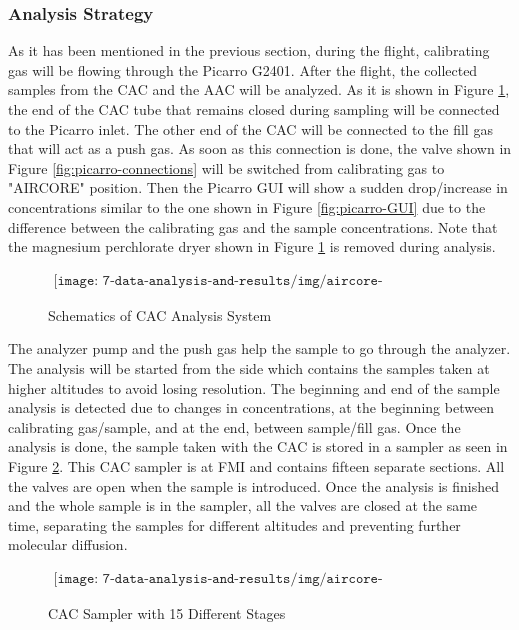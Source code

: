 \subsubsection{Analysis Strategy}

As it has been mentioned in the previous section, during the flight, calibrating gas will be flowing through the Picarro G2401. After the flight, the collected samples from the CAC and the AAC will be analyzed. As it is shown in Figure \ref{fig:aircore-analysis}, the end of the CAC tube that remains closed during sampling will be connected to the Picarro inlet. The other end of the CAC will be connected to the fill gas that will act as a push gas. As soon as this connection is done, the valve shown in Figure \ref{fig:picarro-connections} will be switched from calibrating gas to "AIRCORE" position. Then the Picarro GUI will show a sudden drop/increase in concentrations similar to the one shown in Figure \ref{fig:picarro-GUI} due to the difference between the calibrating gas and the sample concentrations. Note that the magnesium perchlorate dryer shown in Figure \ref{fig:aircore-analysis} is removed during analysis.  

\begin{figure}[H]
    \begin{align*}
        \texttt{[image: 7-data-analysis-and-results/img/aircore-analysis.png]}
    \end{align*}
    \caption{Schematics of CAC Analysis System \cite{AircoreFlights} \label{fig:aircore-analysis}}
\end{figure}

The analyzer pump and the push gas help the sample to go through the analyzer. The analysis will be started from the side which contains the samples taken at higher altitudes to avoid losing resolution. The beginning and end of the sample analysis is detected due to changes in concentrations, at the beginning between calibrating gas/sample, and at the end, between sample/fill gas. Once the analysis is done, the sample taken with the CAC is stored in a sampler as seen in Figure \ref{fig:aircore-sampler}. This CAC sampler is at FMI and contains fifteen separate sections. All the valves are open when the sample is introduced. Once the analysis is finished and the whole sample is in the sampler, all the valves are closed at the same time, separating the samples for different altitudes and preventing further molecular diffusion.  


\begin{figure}[H]
    \begin{align*}
        \texttt{[image: 7-data-analysis-and-results/img/aircore-sampler.jpeg]}
    \end{align*}
    \caption{CAC Sampler with 15 Different Stages \label{fig:aircore-sampler}}
\end{figure}


